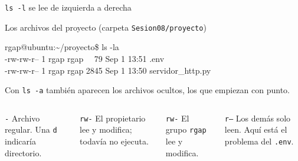 \documentclass[aspectratio=169,10pt,c]{beamer}
\begin{document}
\begin{frame}{\texttt{ls -l} se lee de izquierda a derecha}
\begin{exampleblock}{Los archivos del proyecto \textnormal{\scriptsize(carpeta \texttt{Sesion08/proyecto})}}
\begin{terminal}\footnotesize
rgap@ubuntu:\textasciitilde/proyecto\$ ls -la\\
-rw-rw-r-- 1 rgap rgap ~~79 Sep  1 13:51 .env\\
-rw-rw-r-- 1 rgap rgap 2845 Sep  1 13:50 servidor\_http.py
\end{terminal}
\small Con \texttt{ls -a} también aparecen los archivos ocultos, los que empiezan con punto.
\end{exampleblock}
\begin{columns}[T,onlytextwidth]
\begin{block}{\texttt{-}}
\small Archivo regular. Una \texttt{d} indicaría directorio.
\end{block}
\begin{block}{\texttt{rw-}}
\small El propietario lee y modifica; todavía no ejecuta.
\end{block}
\begin{block}{\texttt{rw-}}
\small El grupo \texttt{rgap} lee y modifica.
\end{block}
\begin{block}{\texttt{r--}}
\small Los demás solo leen. Aquí está el problema del \texttt{.env}.
\end{block}
\end{columns}
\end{frame}
\end{document}
